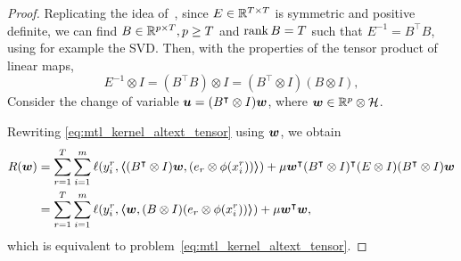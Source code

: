 \begin{proof}
    Replicating the idea of~\cite{EvgeniouMP05}, since ${E} \in \mathbb{R}^{T \times T}$ is symmetric and positive definite, we can find $B \in \mathbb{R}^{p \times T}, p \geq T$ and $\operatorname{rank}{B} = T$ such that $E^{-1} =
            {B^\intercal} {B}$, using for example the SVD.
    Then, with the properties of the tensor product of linear maps,  $$ E^{-1} \otimes I = (B^\intercal B) \otimes I = (B^\intercal \otimes I) (B \otimes I),$$
    Consider the change of variable $\bm{u} = (B^\intercal \otimes I)\bm{w}$, where $\bm{w} \in \mathbb{R}^p \otimes \mathcal{H}$. %

    Rewriting \eqref{eq:mtl_kernel_altext_tensor} using $\bm{w}$, we obtain
    \begin{equation}
        \nonumber
        \begin{aligned}
            R(\bm{w}) & = \sum_{r=1}^{T} \sum_{i=1}^m \ell(y_i^r, \bm{\left\langle} (B^\intercal \otimes I) \bm{w},  (e_r \otimes \phi(x_i^r)) \bm{\right\rangle}) + \mu  \bm{w}^\intercal (B^\intercal \otimes I)^\intercal (E \otimes I) (B^\intercal \otimes I)\bm{w} \\
                         & = \sum_{r=1}^{T} \sum_{i=1}^m \ell(y_i^r, \bm{\left\langle} \bm{w}, (B \otimes I) (e_r \otimes \phi(x_i^r)) \bm{\right\rangle}) + \mu  \bm{w}^\intercal \bm{w} ,                                                                                 \\
        \end{aligned}
    \end{equation}
    which is equivalent to problem~\eqref{eq:mtl_kernel_altext_tensor}.


\end{proof}
